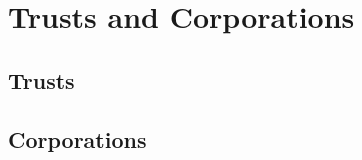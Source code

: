 \chapter{Trusts and Corporations}



\section{Trusts}







\begin{questions}

\end{questions}



\section{Corporations}





\begin{questions}

\end{questions}





\begin{questions}

\end{questions}
